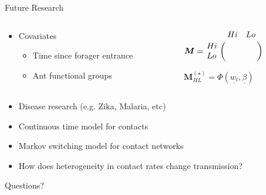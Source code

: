 \documentclass[10pt]{beamer}
\begin{document}

\begin{frame}{Future Research}

\begin{columns}

    \begin{column}{.5\textwidth}
    \begin{block}{}

\begin{itemize}
	
\item Covariates 
    \begin{itemize}
        \item Time since forager entrance
        \item Ant functional groups   
	\end{itemize}
    \end{itemize}
\end{block}
\end{column}
 
 \begin{column}{.5\textwidth}
     \begin{block}{}
     
    
    $\bm{M} = \bordermatrix{
  & Hi & Lo \cr
 Hi & & \cr
 Lo & & 
}$

\vspace{5mm}

$\bm{M}^{(\star)}_{HL} = \Phi (\underline{w_t}, \underline{\beta})  $

\end{block}
\end{column} 
\end{columns}
   
  \begin{itemize}
    
    \item Disease research (e.g. Zika, Malaria, etc)
     \item Continuous time model for contacts
        \item Markov switching model for contact networks
        \item How does heterogeneity in contact rates change transmission?
\end{itemize}
  
\end{frame}



\begin{frame}[standout]
  Questions?
\end{frame}


\end{document}
